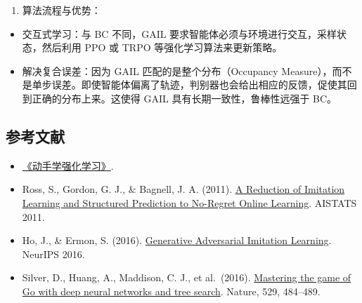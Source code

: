 \begin{enumerate}
\def\labelenumi{\arabic{enumi}.}
\setcounter{enumi}{2}
\tightlist
\item
{}
  算法流程与优势：
\end{enumerate}

\begin{itemize}
\tightlist
\item
  交互式学习：与 BC 不同，GAIL 要求智能体必须与环境进行交互，采样状态，然后利用 PPO 或 TRPO 等强化学习算法来更新策略。
\item
  解决复合误差：因为 GAIL 匹配的是整个分布（Occupancy Measure），而不是单步误差。即使智能体偏离了轨迹，判别器也会给出相应的反馈，促使其回到正确的分布上来。这使得 GAIL 具有长期一致性，鲁棒性远强于 BC。
\end{itemize}

\FloatBarrier
{}
\hypertarget{ux53c2ux8003ux6587ux732e-62}{%
\subsection{参考文献}\label{ux53c2ux8003ux6587ux732e-62}}

\vspace{0.25em}
\begin{itemize}
\tightlist
\item
  \href{https://hrl.boyuai.com/}{《动手学强化学习》}.
\item
  Ross, S., Gordon, G. J., \& Bagnell, J. A. (2011). \href{https://proceedings.mlr.press/v15/ross11a.html}{A Reduction of Imitation Learning and Structured Prediction to No-Regret Online Learning}. AISTATS 2011.
\item
  Ho, J., \& Ermon, S. (2016). \href{https://arxiv.org/abs/1606.03476}{Generative Adversarial Imitation Learning}. NeurIPS 2016.
\item
  Silver, D., Huang, A., Maddison, C. J., et al.~(2016). \href{https://doi.org/10.1038/nature16961}{Mastering the game of Go with deep neural networks and tree search}. Nature, 529, 484--489.
\end{itemize}

\clearpage
